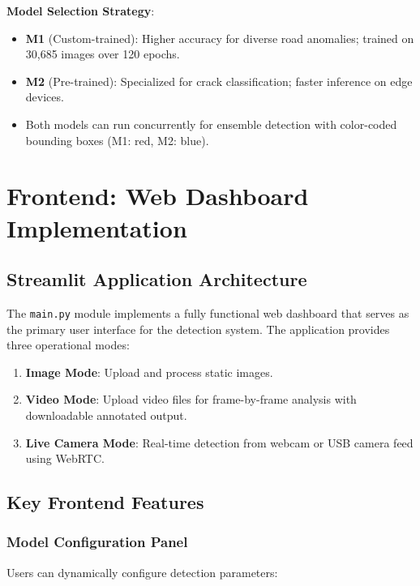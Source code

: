 \documentclass[12pt]{article}
\begin{document}
\textbf{Model Selection Strategy}:

\begin{itemize}
    \item \textbf{M1} (Custom-trained): Higher accuracy for diverse road anomalies; trained on 30,685 images over 120 epochs.
    \item \textbf{M2} (Pre-trained): Specialized for crack classification; faster inference on edge devices.
    \item Both models can run concurrently for ensemble detection with color-coded bounding boxes (M1: red, M2: blue).
\end{itemize}

\clearpage

\section{Frontend: Web Dashboard Implementation}

\subsection{Streamlit Application Architecture}

The \texttt{main.py} module implements a fully functional web dashboard that serves as the primary user interface for the detection system. The application provides three operational modes:

\begin{enumerate}
    \item \textbf{Image Mode}: Upload and process static images.
    \item \textbf{Video Mode}: Upload video files for frame-by-frame analysis with downloadable annotated output.
    \item \textbf{Live Camera Mode}: Real-time detection from webcam or USB camera feed using WebRTC.
\end{enumerate}

\subsection{Key Frontend Features}

\subsubsection*{Model Configuration Panel}

Users can dynamically configure detection parameters:
\end{document}
